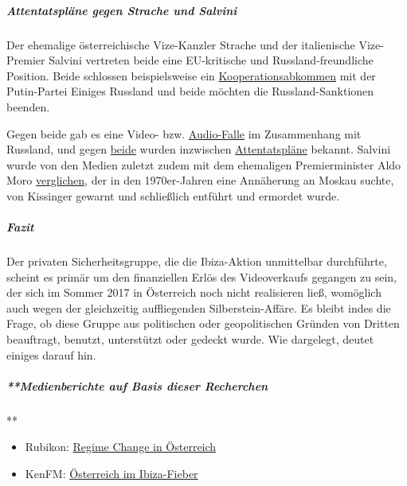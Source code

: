 \hypertarget{attentatspluxe4ne-gegen-strache-und-salvini}{%
\subparagraph{\texorpdfstring{\textbf{Attentatspläne gegen Strache und
Salvini}}{Attentatspläne gegen Strache und Salvini}}\label{attentatspluxe4ne-gegen-strache-und-salvini}}

Der ehemalige österreichische Vize-Kanzler Strache und der italienische
Vize-Premier Salvini vertreten beide eine EU-kritische und
Russland-freundliche Position. Beide schlossen beispiels­weise ein
\href{https://www.faz.net/aktuell/politik/ausland/lega-nord-chef-salvini-will-hilfe-aus-moskau-14913862.html}{Kooperations­abkommen}
mit der Putin-Partei Einiges Russland und beide möchten die
Russland-Sanktionen beenden.

Gegen beide gab es eine Video- bzw.
\href{https://www.buzzfeednews.com/article/albertonardelli/salvini-russia-oil-deal-secret-recording}{Audio-Falle}
im Zusammenhang mit Russland, und gegen
\href{https://de.euronews.com/2019/07/17/salvini-ukrainer-haben-ein-attentat-auf-mich-geplant}{beide}
wurden inzwischen
\href{https://diepresse.com/home/innenpolitik/5649832/Anschlag-auf-Strache-geplant}{Attentatspläne}
bekannt. Salvini wurde von den Medien zuletzt zudem mit dem ehemaligen
Premierminister Aldo Moro
\href{https://www.tpi.it/2019/08/05/salvini-moro-mare-fusaro/}{verglichen},
der in den 1970er-Jahren eine Annäherung an Moskau suchte, von Kissinger
gewarnt und schließlich entführt und ermordet wurde.

\hypertarget{fazit}{%
\subparagraph{\texorpdfstring{\textbf{Fazit}}{Fazit}}\label{fazit}}

Der privaten Sicherheitsgruppe, die die Ibiza-Aktion unmittelbar
durchführte, scheint es primär um den finanziellen Erlös des
Videoverkaufs gegangen zu sein, der sich im Sommer 2017 in Österreich
noch nicht realisieren ließ, womöglich auch wegen der gleichzeitig
auffliegenden Silberstein-Affäre. Es bleibt indes die Frage, ob diese
Gruppe aus politischen oder geopolitischen Gründen von Dritten
beauftragt, benutzt, unterstützt oder gedeckt wurde. Wie dargelegt,
deutet einiges darauf hin.

\hypertarget{medienberichte-auf-basis-dieser-recherchen}{%
\subparagraph{**Medienberichte auf Basis dieser
Recherchen}\label{medienberichte-auf-basis-dieser-recherchen}}

**

\begin{itemize}
\tightlist
\item
  Rubikon:
  \href{https://www.rubikon.news/artikel/regime-change-in-osterreich}{Regime
  Change in Österreich}
\item
  KenFM:
  \href{https://kenfm.de/tagesdosis-3-6-2019-oesterreich-im-ibiza-fieber-paaasst-scho/}{Österreich
  im Ibiza-Fieber}
\end{itemize}


